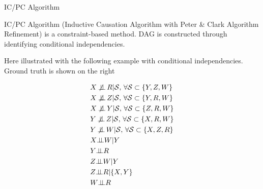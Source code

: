 \begin{point}
    IC/PC Algorithm
\end{point}

IC/PC Algorithm (Inductive Causation Algorithm with Peter \& Clark Algorithm Refinement) is a constraint-based method. DAG is constructed through identifying conditional independencies.

Here illustrated with the following example with conditional independencies. Ground truth is shown on the right 

\begin{center}
    \begin{minipage}{0.4\linewidth}
        \begin{align*}
            &X \not\!\!\mathop{\independent} R |\mathcal{S},\,\forall \mathcal{S}\subset\{Y,Z,W\}\\
            &X \not\!\!\mathop{\independent} Z |\mathcal{S},\,\forall \mathcal{S}\subset\{Y,R,W\}\\
            &X \not\!\!\mathop{\independent} Y |\mathcal{S},\,\forall \mathcal{S}\subset\{Z,R,W\}\\
            &Y \not\!\!\mathop{\independent} Z |\mathcal{S},\,\forall \mathcal{S}\subset\{X,R,W\}\\
            &Y \not\!\!\mathop{\independent} W |\mathcal{S},\,\forall \mathcal{S}\subset\{X,Z,R\}\\
            &X\independent W|Y\\
            &Y\independent R\\
            &Z\independent W|Y\\
            &Z\independent R|\{X,Y\}\\
            &W\independent R
        \end{align*}
    \end{minipage}
    \end{center}




